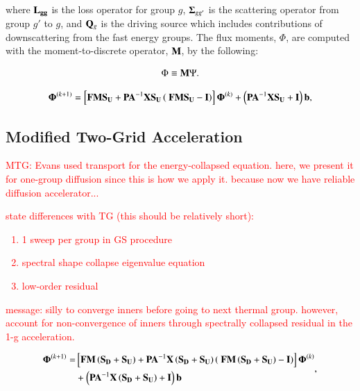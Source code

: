 \documentclass[preprint,10pt]{elsarticle}
\newcommand{\tcr}[1]{\textcolor{red}{#1}}
\begin{document}
\noindent where ${\bf L_{gg}}$ is the loss operator for group $g$, ${\bf \Sigma}_{g g'}$ is the scattering operator from group $g'$ to $g$, and ${\bf Q}_g$ is the driving source which includes contributions of downscattering from the fast energy groups. The flux moments, $\Phi$, are computed with the moment-to-discrete operator, ${\bf M}$, by the following:

\begin{equation}
\label{eq::DSA_TG_GS_op_update_simple}
\Phi \equiv {\bf M} \Psi. 
\end{equation}


\begin{equation}
\label{eq::DSA_TG_GS_op_update_simple}
 {\bf \Phi}^{(k+1)} = \left[ {\bf F}  {\bf M} {\bf S_U} +  {\bf P} {\bf A}^{-1}  {\bf X} {\bf S_{U}} \left(  \ {\bf F}  {\bf M} {\bf S_U}  -  {\bf I} \right) \right] {\bf \Phi}^{(k)} + \left(  {\bf P} {\bf A}^{-1}  {\bf X} {\bf S_{U}}  + {\bf I} \right) {\bf b} ,
\end{equation}

\subsection{Modified Two-Grid Acceleration}
\tcr{MTG: Evans used transport for the energy-collapsed equation. here, we present it for one-group diffusion since this is how we apply it. because now we have reliable diffusion accelerator...}
\tcr
{
state differences with TG (this should be relatively short):
\begin{enumerate}
\item 1 sweep per group in GS procedure
\item spectral shape collapse eigenvalue equation
\item low-order residual
\end{enumerate}
message: silly to converge inners before going to next thermal group. however, account for non-convergence of inners through spectrally collapsed residual in the 1-g acceleration.}

\begin{equation}
\label{eq::DSA_MTG_GS_op_update_simple}
\begin{aligned}
 {\bf \Phi}^{(k+1)} = &\left[ {\bf F}  {\bf M} \left( {\bf S_{D}} + {\bf S_{U}} \right) +  {\bf P} {\bf A}^{-1}  {\bf X} \left( {\bf S_{D}} + {\bf S_{U}} \right) \left(  \ {\bf F}  {\bf M} \left( {\bf S_{D}} + {\bf S_{U}} \right)  -  {\bf I} \right) \right] {\bf \Phi}^{(k)} \\
&+ \left(  {\bf P} {\bf A}^{-1}  {\bf X} \left( {\bf S_{D}} + {\bf S_{U}} \right)  + {\bf I} \right) {\bf b}
\end{aligned} ,
\end{equation}
\end{document}

